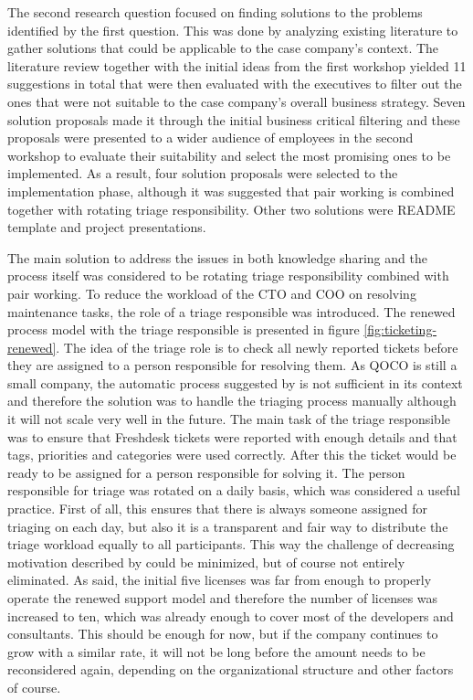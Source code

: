 The second research question focused on finding solutions to the problems identified by the first question. This was done by analyzing existing literature
to gather solutions that could be applicable to the case company's context. The literature review together with
the initial ideas from the first workshop yielded 11 suggestions in total that were then evaluated with the executives to filter out the ones that were not suitable to the case company's overall business strategy.
Seven solution proposals made it through the initial business critical filtering and these proposals were presented to a wider audience of employees in the second workshop to evaluate their suitability and
select the most promising ones to be implemented. As a result, four solution proposals were selected to the implementation phase, although it was suggested that pair working is combined together with rotating
triage responsibility. Other two solutions were README template and project presentations.

The main solution to address the issues in both knowledge sharing and the process itself was considered to be rotating triage responsibility combined with pair working.
To reduce the workload of the CTO and COO on
resolving maintenance tasks, the role of a triage responsible was introduced. The renewed process model with the triage responsible is presented in figure \ref{fig:ticketing-renewed}. The idea of the triage role
is to check all newly reported tickets before they are assigned to a person responsible for resolving them. As QOCO is still a small company, the automatic process suggested by \citet{Hu2014} is not sufficient
in its context and therefore the solution was to handle the triaging process manually although it will not scale very well in the future.
The main task of the triage responsible was to ensure that Freshdesk tickets were reported with enough details and that tags, priorities and
categories were used correctly. After this the ticket would be ready to be assigned for a person responsible for solving it.
The person responsible for triage was rotated on a daily basis, which was considered a useful practice. First of all, this ensures that
there is always someone assigned for triaging on each day, but also it is a transparent and fair way to distribute the triage workload equally to all participants. This way the challenge of decreasing motivation
described by \citet{Faegri2009} could be minimized, but of course not entirely eliminated. As said, the initial five licenses was
far from enough to properly operate the renewed support model and therefore the number of licenses was increased to ten, which was already enough to cover most of the developers and consultants. This should
be enough for now, but if the company continues to grow with a similar rate, it will not be long before the amount needs to be reconsidered again, depending on the organizational structure and other factors of
course.

